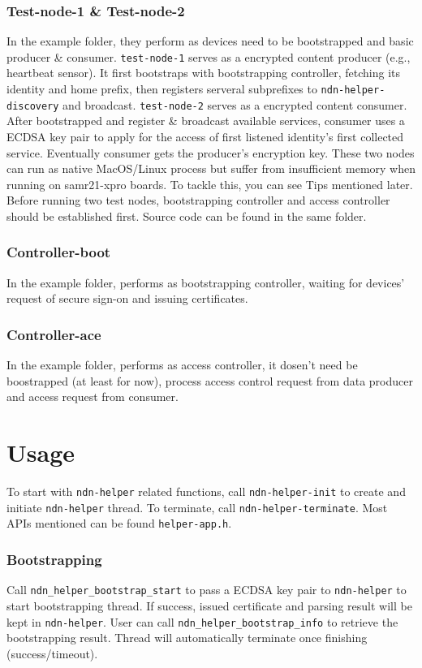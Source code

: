 \documentclass[a4paper, 11pt]{article}
\begin{document}
        \subsubsection*{Test-node-1 \& Test-node-2}
        In the example folder, they perform as devices need to be bootstrapped and basic producer \& consumer. \texttt{test-node-1} serves as a encrypted content producer (e.g., heartbeat sensor). It first bootstraps with bootstrapping controller, fetching its identity and home prefix, then registers serveral subprefixes to \texttt{ndn-helper-discovery} and broadcast. 
        \texttt{test-node-2} serves as a encrypted content consumer. After bootstrapped and register \& broadcast available services, consumer uses a ECDSA key pair to apply for the access of first listened identity's first collected service. Eventually consumer gets the producer's encryption key. These two nodes can run as native MacOS/Linux process but suffer from insufficient memory when running on samr21-xpro boards. To tackle this, you can see Tips mentioned later. Before running two test nodes, bootstrapping controller and access controller 
        should be established first. Source code can be found in the same folder.

        \subsubsection*{Controller-boot}
        In the example folder, performs as bootstrapping controller, waiting for devices' request of secure sign-on and issuing certificates. 
         
        \subsubsection*{Controller-ace}
        In the example folder, performs as access controller, it dosen't need be boostrapped (at least for now), process access control request from data producer and access request from consumer. 

        \section*{Usage}
        To start with \texttt{ndn-helper} related functions, call \texttt{ndn-helper-init} to create and initiate \texttt{ndn-helper} thread. To terminate, call \texttt{ndn-helper-terminate}. Most APIs mentioned can be found \texttt{helper-app.h}.
        
        \subsubsection*{Bootstrapping}
        Call \texttt{ndn\_helper\_bootstrap\_start} to pass a ECDSA key pair to \texttt{ndn-helper} to start bootstrapping thread. If success, issued certificate and parsing result will be kept in \texttt{ndn-helper}. User can call \texttt{ndn\_helper\_bootstrap\_info} to retrieve the bootstrapping result. Thread will automatically terminate once finishing (success/timeout).
    
\end{document}
